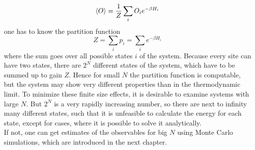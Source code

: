     \begin{equation}
        \left< O \right> = \frac{1}{Z} \sum_i O_i e^{-\beta H_i}
    \end{equation}
    one has to know the partition function
    \begin{equation}
        Z = \sum_i p_i = \sum_i e^{-\beta H_i}
    \end{equation}
    where the sum goes over all possible states \(i\) of the system.
    Because every site can have two states, there are \(2^N\) different
    states of the system, which have to be summed up to gain \(Z\).
    Hence for small \(N\) the partition function is computable, but the system
    may show very different properties than in the thermodynamic limit.
    To minimize these finite size effects, it is desirable to examine
    systems with large \(N\). But \(2^N\) is a very rapidly increasing
    number, so there are next to infinity many different states, such
    that it is unfeasible to calculate the energy for each state, except
    for cases, where it is possible to solve it analytically.\\
    If not, one can get estimates of the observables for big \(N\) using
    Monte Carlo simulations, which are introduced in the next chapter.\\

